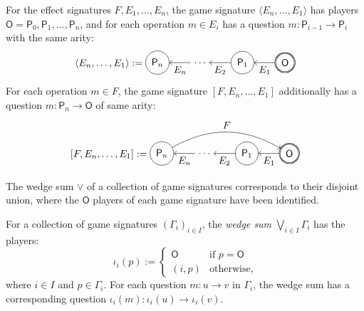 \documentclass[format=sigplan,authordraft]{acmart}
\newcommand{\kw}[1]{\ensuremath{ \mathsf{#1} }}
\begin{document}
\begin{definition}
For the effect signatures $F, E_1, \ldots, E_n$,
the game signature $\langle E_n, \ldots, E_1 \rangle$
has players $\kw{O} = \kw{P}_0, \kw{P}_1, \ldots, \kw{P}_n$,
and for each operation $m \in E_i$
has a question $m : \kw{P}_{i-1} \rightarrow \kw{P}_i$
with the same arity:
\[
  \langle E_n, \ldots, E_1 \rangle :=
  \begin{tikzpicture}[scale=1.5,baseline=(O.base)]
    \node[circle,draw,double] (O) at (0,0) {$\kw{O}$};
    \node[circle,draw] (P1) at (-1,0) {$\kw{P}_1$};
    \node (D) at (-2,0) {$\ldots$};
    \node[circle,draw] (Pn) at (-3,0) {$\kw{P}_n$};
    \path[->] (O) edge node[below] {$E_1$} (P1);
    \path[->] (P1) edge node[below] {$E_2$} (D);
    \path[->] (D) edge node[below] {$E_n$} (Pn);
  \end{tikzpicture}
\]
For each operation $m \in F$,
the game signature $[F, E_n, \ldots, E_1]$
additionally
has a question $m : \kw{P}_n \rightarrow \kw{O}$
of same arity:
\[
  [F, E_n, \ldots, E_1] :=
  \begin{tikzpicture}[scale=1.5,baseline=(O.base)]
    \node[circle,draw,double] (O) at (0,0) {$\kw{O}$};
    \node[circle,draw] (P1) at (-1,0) {$\kw{P}_1$};
    \node (D) at (-2,0) {$\ldots$};
    \node[circle,draw] (Pn) at (-3,0) {$\kw{P}_n$};
    \path[->] (O) edge node[below] {$E_1$} (P1);
    \path[->] (P1) edge node[below] {$E_2$} (D);
    \path[->] (D) edge node[below] {$E_n$} (Pn);
    \path[->] (Pn) edge[bend left] node[above] {$F$} (O);
  \end{tikzpicture}
\]
\end{definition}

The wedge sum $\vee$ of a collection of game signatures
corresponds to their disjoint union,
where the $\kw{O}$ players of each game signature
have been identified.

\begin{definition}
For a collection of game signatures $(\Gamma_i)_{i \in I}$,
the \emph{wedge sum} $\bigvee_{i \in I} \Gamma_i$ has the players:
\[
  \iota_i(p) := \begin{cases}
    \kw{O} & \text{if } p = \kw{O} \\
    (i, p) & \text{otherwise,}
  \end{cases}
\]
where $i \in I$ and $p \in \Gamma_i$.
For each question $m : u \rightarrow v$ in $\Gamma_i$,
the wedge sum has a corresponding question
$\iota_i(m) : \iota_i(u) \rightarrow \iota_i(v)$.
\end{definition}
\end{document}
